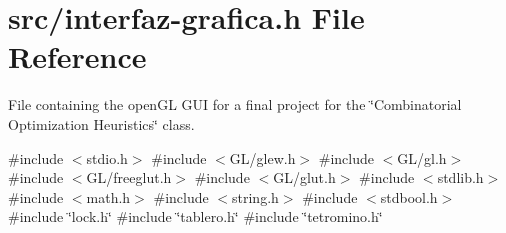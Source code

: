\hypertarget{interfaz-grafica_8h}{}\section{src/interfaz-\/grafica.h File Reference}
\label{interfaz-grafica_8h}


File containing the open\+GL G\+UI for a final project for the \char`\"{}\+Combinatorial Optimization Heuristics\char`\"{} class.  


{\ttfamily \#include $<$stdio.\+h$>$}\newline
{\ttfamily \#include $<$G\+L/glew.\+h$>$}\newline
{\ttfamily \#include $<$G\+L/gl.\+h$>$}\newline
{\ttfamily \#include $<$G\+L/freeglut.\+h$>$}\newline
{\ttfamily \#include $<$G\+L/glut.\+h$>$}\newline
{\ttfamily \#include $<$stdlib.\+h$>$}\newline
{\ttfamily \#include $<$math.\+h$>$}\newline
{\ttfamily \#include $<$string.\+h$>$}\newline
{\ttfamily \#include $<$stdbool.\+h$>$}\newline
{\ttfamily \#include \char`\"{}lock.\+h\char`\"{}}\newline
{\ttfamily \#include \char`\"{}tablero.\+h\char`\"{}}\newline
{\ttfamily \#include \char`\"{}tetromino.\+h\char`\"{}}\newline
